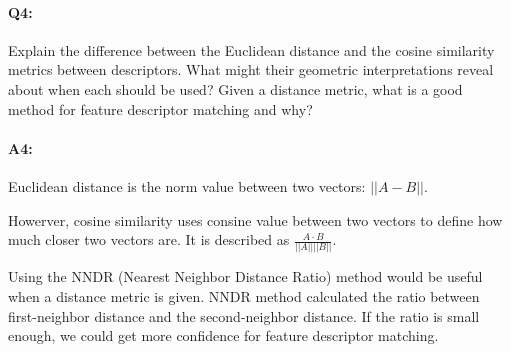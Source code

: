 

\pagebreak
\paragraph{Q4:} Explain the difference between the Euclidean distance and the cosine similarity metrics between descriptors. What might their geometric interpretations reveal about when each should be used? Given a distance metric, what is a good method for feature descriptor matching and why?

\paragraph{A4:} Euclidean distance is the norm value between two vectors: $ || A - B || $.

Howerver, cosine similarity uses consine value between two vectors to define how much closer two vectors are. It is described as $ \frac{A \cdot B}{||A|| ||B||} $.

Using the NNDR (Nearest Neighbor Distance Ratio) method would be useful when a distance metric is given. NNDR method calculated the ratio between first-neighbor distance and the second-neighbor distance.
If the ratio is small enough, we could get more confidence for feature descriptor matching.






